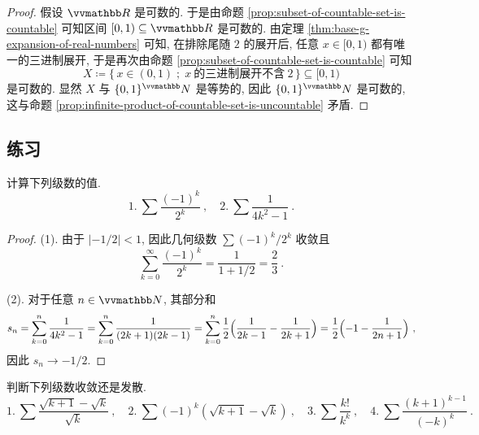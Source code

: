 \begin{proof}
    假设 \(\R\) 是可数的. 于是由命题 \ref{prop:subset-of-countable-set-is-countable} 可知区间 \([0, 1) \subseteq \R\) 是可数的. 由定理 \ref{thm:base-g-expansion-of-real-numbers} 可知, 在排除尾随 \(2\) 的展开后, 任意 \(x \in [0, 1)\) 都有唯一的三进制展开, 于是再次由命题 \ref{prop:subset-of-countable-set-is-countable} 可知
    \[
        X \coloneqq \bigl\{\, x \in (0, 1) \;;\; x\ \text{的三进制展开不含}\ 2 \,\bigr\} \subseteq [0, 1)
    \]
    是可数的. 显然 \(X\) 与 \(\{0, 1\}^\N\) 是等势的, 因此 \(\{0, 1\}^\N\) 是可数的, 这与命题 \ref{prop:infinite-product-of-countable-set-is-uncountable} 矛盾.
\end{proof}

\subsection{练习}

\begin{exercise}
    计算下列级数的值.
    \[
        1.\ \sum \frac{(- 1)^k}{2^k}\ ,\quad 2.\ \sum \frac{1}{4 k^2 - 1}\ .
    \]
\end{exercise}

\begin{proof}
    (1). 由于 \(|- 1 / 2| < 1\), 因此几何级数 \(\sum (- 1)^k / 2^k\) 收敛且
    \[
        \sum_{k = 0}^\infty \frac{(- 1)^k}{2^k} = \frac{1}{1 + 1/ 2} = \frac{2}{3}\ .
    \]

    (2). 对于任意 \(n \in \N\), 其部分和
    \[
        s_n = \sum_{k = 0}^n \frac{1}{4 k^2 - 1} = \sum_{k = 0}^n \frac{1}{(2 k + 1) (2 k - 1)} = \sum_{k = 0}^n \frac{1}{2} \Bigl(\frac{1}{2 k - 1} - \frac{1}{2 k + 1}\Bigr) = \frac{1}{2} \Bigl(- 1 - \frac{1}{2 n + 1}\Bigr)\ ,
    \]
    因此 \(s_n \to - 1 / 2\).
\end{proof}

\begin{exercise}
    判断下列级数收敛还是发散.
    \[
        1.\ \sum \frac{\sqrt{k + 1} - \sqrt{k}}{\sqrt{k}}\ ,\quad 2.\ \sum (- 1)^k (\sqrt{k + 1} - \sqrt{k})\ ,\quad 3.\ \sum \frac{k!}{k^k}\ ,\quad 4.\ \sum \frac{(k + 1)^{k - 1}}{(- k)^k}\ .
    \]
\end{exercise}

